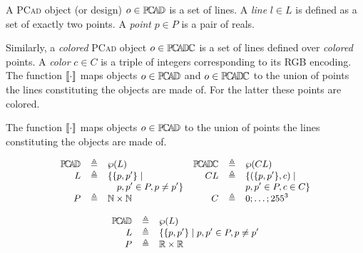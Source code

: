 \begin{Definition} A \textsc{PCad}
object (or design) $o\in \mathbb{P}\!\mathbb{C}\!\mathbb{A}\!\mathbb{D} $ is a set of lines.
A \emph{line} $l \in L$ is defined as a set of exactly two points.
A \emph{point} $p\in P$ is a pair of reals.
\begin{olddef}
Similarly, a \emph{colored} \textsc{PCad} object $o\in \mathbb{P}\!\mathbb{C}\!\mathbb{A}\!\mathbb{D} \!\mathbb{C} $ is a set of 
lines defined over \emph{colored} points.
A \emph{color} $c\in C$ is a triple of integers corresponding to its RGB encoding.
The function $\llbracket \cdot \rrbracket$ maps objects $o\in \mathbb{P}\!\mathbb{C}\!\mathbb{A}\!\mathbb{D} $ and $o\in \mathbb{P}\!\mathbb{C}\!\mathbb{A}\!\mathbb{D} \!\mathbb{C} $ to the
union of points the lines constituting the objects are made of.
For the latter these points are colored.
\end{olddef}
\begin{newdef}
The function $\llbracket \cdot \rrbracket$ maps objects $o\in \mathbb{P}\!\mathbb{C}\!\mathbb{A}\!\mathbb{D} $ to the union of points 
the lines constituting the objects are made of.
\end{newdef}

\begin{olddef}
\begin{displaymath}
\begin{small}
\begin{array}{rcl rcl}

\PCAD &\eqdef& \wp(L)                         & \PCADC &\eqdef& \wp(CL)\\
L     &\eqdef& \{ \{p, p'\} \;|\;             & 
CL    &\eqdef& \{ (\{p, p'\}, c) \;|\;  \\  
      &      & \quad p, p' \in P, p\neq p' \} & & & p, p' \in P, c\in C\}\\
P     &\eqdef& \mathbb{N} \times \mathbb{N}   & C     &\eqdef& 
{0; \ldots; 255}^3

\end{array}
\end{small}
\end{displaymath}
\end{olddef}

\begin{newdef}
\begin{displaymath}
\begin{small}
\begin{array}{rcl}
\PCAD &\eqdef& \wp(L)                                       \\%
L     &\eqdef& \{ \{p, p'\} \;|\; p, p' \in P, p\neq p'     \\%
P     &\eqdef& \mathbb{R} \times \mathbb{R}                 \\%
\end{array}
\end{small}
\end{displaymath}
\end{newdef}


\end{Definition}

